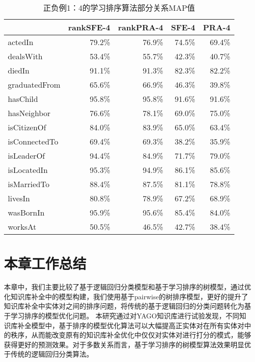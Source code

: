 \begin{table}[htbp]
  \centering
  \caption{正负例1：4的学习排序算法部分关系MAP值}
    \begin{tabular}{|l|r|r|r|r|}
    \hline
          & \multicolumn{1}{l|}{rankSFE-4} & \multicolumn{1}{l|}{rankPRA-4} & \multicolumn{1}{l|}{SFE-4} & \multicolumn{1}{l|}{PRA-4} \bigstrut\\
    \hline
    actedIn                                                     & 79.2\%  & 76.9\%  & 74.5\%  & 69.4\%  \bigstrut\\
    \hline
    dealsWith                                                   & 53.4\%  & 55.7\%  & 42.3\%  & 40.7\%  \bigstrut\\
    \hline
    diedIn                                                      & 91.1\%  & 91.3\%  & 82.3\%  & 82.2\%  \bigstrut\\
    \hline
    graduatedFrom                                               & 65.6\%  & 66.9\%  & 46.3\%  & 39.8\%  \bigstrut\\
    \hline
    hasChild                                                    & 95.8\%  & 95.8\%  & 91.6\%  & 91.6\%  \bigstrut\\
    \hline
    hasNeighbor                                                 & 76.6\%  & 78.1\%  & 69.0\%  & 75.0\%  \bigstrut\\
    \hline
    isCitizenOf                                                 & 84.0\%  & 83.9\%  & 65.0\%  & 63.4\%  \bigstrut\\
    \hline
    isConnectedTo                                               & 69.4\%  & 69.3\%  & 38.2\%  & 35.9\%  \bigstrut\\
    \hline
    isLeaderOf                                                  & 94.4\%  & 84.9\%  & 71.7\%  & 79.0\%  \bigstrut\\
    \hline
    isLocatedIn                                                 & 95.3\%  & 94.9\%  & 86.1\%  & 85.6\%  \bigstrut\\
    \hline
    isMarriedTo                                                 & 88.4\%  & 87.5\%  & 81.1\%  & 78.8\%  \bigstrut\\
    \hline
    livesIn                                                     & 80.8\%  & 78.9\%  & 67.2\%  & 68.9\%  \bigstrut\\
    \hline
    wasBornIn                                                   & 95.9\%  & 95.6\%  & 85.4\%  & 84.0\%  \bigstrut\\
    \hline
    worksAt                                                     & 50.5\%  & 46.5\%  & 42.7\%  & 38.4\%  \bigstrut\\
    \hline
    \end{tabular}%
  \label{tab:kbc-yago-rank4}%
\end{table}%

\section{本章工作总结}
本章中，我们主要比较了基于逻辑回归分类模型和基于学习排序的树模型，通过优化知识库补全中的模型构建，我们使用基于pairwise的树排序模型，更好的提升了知识库补全中实体对之间的排序问题，将传统的基于逻辑回归的分类问题转化为基于学习排序的模型优化问题。
本研究通过对YAGO知识库进行试验发现，不同知识库补全模型中，基于排序的模型优化算法可以大幅提高正实体对在所有实体对中的秩序，从而能改变原有的知识库补全优化中仅仅对实体对进行打分的模式，能够获得更好的预测效果。对于多数关系而言，基于学习排序的树模型算法效果明显优于传统的逻辑回归分类算法。
